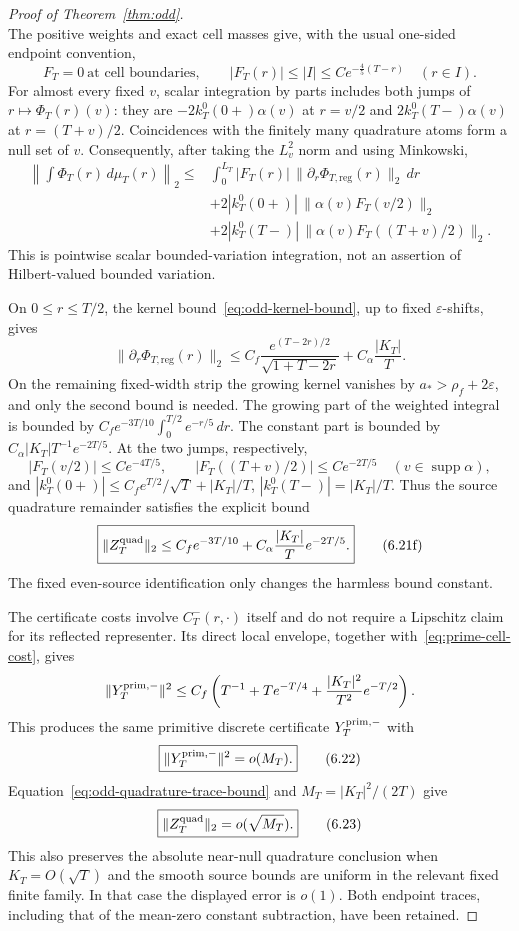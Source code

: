 \begin{proof}[Proof of Theorem~\ref{thm:odd}]
\[\]
The positive weights and exact cell masses give, with the usual one-sided
endpoint convention,
\[
 F_T=0\ \text{at cell boundaries},\qquad
 |F_T(r)|\le |I|\le C e^{-\frac45(T-r)}\quad(r\in I).
\tag{6.21d}\label{eq:odd-quadrature-cumulative}
\]
For almost every fixed $v$, scalar integration by parts includes both jumps
of $r\mapsto\Phi_T(r)(v)$: they are
$-2k_T^0(0+)\alpha(v)$ at $r=v/2$ and
$2k_T^0(T-)\alpha(v)$ at $r=(T+v)/2$.
Coincidences with the finitely many quadrature atoms form a null set of $v$.
Consequently, after taking the $L^2_v$ norm and using Minkowski,
\[
 \begin{aligned}
 \left\|\int\Phi_T(r)\,d\mu_T(r)\right\|_2
 \le{}&
 \int_0^{L_T}|F_T(r)|\,
       \|\partial_r\Phi_{T,\mathrm{reg}}(r)\|_2\,dr\\
 &+2|k_T^0(0+)|\,\|\alpha(v)F_T(v/2)\|_2\\
 &+2|k_T^0(T-)|\,\|\alpha(v)F_T((T+v)/2)\|_2.
 \end{aligned}
\tag{6.21e}\label{eq:odd-quadrature-with-traces}
\]
This is pointwise scalar bounded-variation integration, not an assertion
of Hilbert-valued bounded variation.

On $0\le r\le T/2$, the kernel bound~\eqref{eq:odd-kernel-bound},
up to fixed $\varepsilon$-shifts, gives
\[
 \|\partial_r\Phi_{T,\mathrm{reg}}(r)\|_2
 \le C_f\frac{e^{(T-2r)/2}}{\sqrt{1+T-2r}}
       +C_\alpha\frac{|K_T|}{T}.
\]
On the remaining fixed-width strip the growing kernel vanishes by
$a_*>\rho_f+2\varepsilon$, and only the second bound is needed.
The growing part of the weighted integral is bounded by
$C_f e^{-3T/10}\int_0^{T/2}e^{-r/5}\,dr$.
The constant part is bounded by $C_\alpha |K_T|T^{-1}e^{-2T/5}$.
At the two jumps, respectively,
\[
 |F_T(v/2)|\le C e^{-4T/5},\qquad
 |F_T((T+v)/2)|\le C e^{-2T/5}
 \quad(v\in\operatorname{supp}\alpha),
\]
and
$|k_T^0(0+)|\le C_f e^{T/2}/\sqrt T+|K_T|/T$,
$|k_T^0(T-)|=|K_T|/T$.
Thus the source quadrature remainder satisfies the explicit bound
\[
 \boxed{\|Z_T^{\rm quad}\|_2
 \le C_f e^{-3T/10}
      +C_\alpha\frac{|K_T|}{T}e^{-2T/5}.}
\tag{6.21f}\label{eq:odd-quadrature-trace-bound}
\]
The fixed even-source identification only changes the harmless bound constant.

The certificate costs involve $C_T^-(r,\cdot)$ itself and do not require a
Lipschitz claim for its reflected representer.  Its direct local envelope,
together with~\eqref{eq:prime-cell-cost}, gives
\[
 \|Y_T^{\rm prim,-}\|^2
 \le C_f\left(T^{-1}+Te^{-T/4}
       +\frac{|K_T|^2}{T^2}e^{-T/2}\right).
\]
This produces the same primitive
discrete certificate $Y_T^{\rm prim,-}$ with
\[
 \boxed{\|Y_T^{\rm prim,-}\|^2=o(M_T).}
\tag{6.22}\label{eq:odd-prim-cost}
\]
Equation~\eqref{eq:odd-quadrature-trace-bound} and
$M_T=|K_T|^2/(2T)$ give
\[
 \boxed{\|Z_T^{\rm quad}\|_2=o(\sqrt{M_T}).}
\tag{6.23}\label{eq:odd-quadrature-error}
\]
This also preserves the absolute near-null quadrature conclusion when
$K_T=O(\sqrt T)$ and the smooth source bounds are uniform in the relevant
fixed finite family.  In that case the displayed error is $o(1)$.
Both endpoint traces, including that of the mean-zero constant subtraction,
have been retained.


\end{proof}
